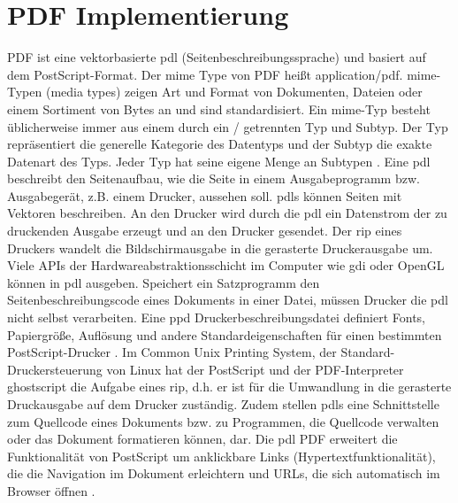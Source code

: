 \section{PDF Implementierung}
PDF ist eine vektorbasierte \gls{pdl} (Seitenbeschreibungssprache) und basiert auf dem PostScript-Format. Der \gls{mime} Type von PDF heißt application/pdf. \gls{mime}-Typen (media types) zeigen Art und Format von Dokumenten, Dateien oder einem Sortiment von Bytes an und sind standardisiert. Ein \gls{mime}-Typ besteht üblicherweise immer aus einem durch ein / getrennten Typ und Subtyp. Der Typ repräsentiert die generelle Kategorie des Datentyps und der Subtyp die exakte Datenart des Typs. Jeder Typ hat seine eigene Menge an Subtypen \cite{mime}. Eine \gls{pdl} beschreibt den Seitenaufbau, wie die Seite in einem Ausgabeprogramm bzw. Ausgabegerät, z.B. einem Drucker, aussehen soll. \gls{pdl}s können Seiten mit Vektoren beschreiben. An den Drucker wird durch die \gls{pdl} ein Datenstrom der zu druckenden Ausgabe erzeugt und an den Drucker gesendet. Der \gls{rip} eines Druckers wandelt die Bildschirmausgabe in die gerasterte Druckerausgabe um. Viele APIs der Hardwareabstraktionsschicht im Computer wie \gls{gdi} oder OpenGL können in \gls{pdl} ausgeben. Speichert ein Satzprogramm den Seitenbeschreibungscode eines Dokuments in einer Datei, müssen Drucker die \gls{pdl} nicht selbst verarbeiten. Eine \gls{ppd} Druckerbeschreibungsdatei definiert Fonts, Papiergröße, Auflösung und andere Standardeigenschaften für einen bestimmten PostScript-Drucker \cite{ppd-file}. Im Common Unix Printing System, der Standard-Druckersteuerung von Linux hat der PostScript und der PDF-Interpreter ghostscript die Aufgabe eines \gls{rip}, d.h. er ist für die Umwandlung in die gerasterte Druckausgabe auf dem Drucker zuständig. Zudem stellen \gls{pdl}s eine Schnittstelle zum Quellcode eines Dokuments bzw. zu Programmen, die Quellcode verwalten oder das Dokument formatieren können, dar. Die \gls{pdl} PDF erweitert die Funktionalität von PostScript um anklickbare Links (Hypertextfunktionalität), die die Navigation im Dokument erleichtern und URLs, die sich automatisch im Browser öffnen \cite{wiki-pdl}.

